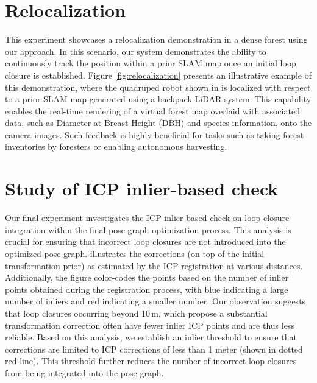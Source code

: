 \section{Relocalization} 
\label{sec:exp_relocalization}
This experiment showcases a relocalization demonstration in a dense forest using our approach. In this scenario, our system demonstrates the ability to continuously track the position within a prior SLAM map once an initial loop closure is established.
Figure \ref{fig:relocalization} presents an illustrative example of this demonstration, where the quadruped robot shown in  is localized with respect to a prior SLAM map generated using a backpack LiDAR system. This capability enables the real-time rendering of a virtual forest map overlaid with associated data, such as Diameter at Breast Height (DBH) and species information, onto the camera images. Such feedback is highly beneficial for tasks such as taking forest inventories by foresters or enabling autonomous harvesting.



\section{Study of ICP inlier-based check}
\label{sec:exp_icp_ablation}

Our final experiment investigates the ICP inlier-based check on loop closure integration within the final pose graph optimization process. This analysis is crucial for ensuring that incorrect loop closures are not introduced into the optimized pose graph.
 illustrates the corrections (on top of the initial transformation prior) as estimated by the ICP registration at various distances. Additionally, the figure color-codes the points based on the number of inlier points obtained during the registration process, with blue indicating a large number of inliers and red indicating a smaller number.
Our observation suggests that loop closures occurring beyond 10\,m, which propose a substantial transformation correction often have fewer inlier ICP points and are thus less reliable.
Based on this analysis, we establish an inlier threshold to ensure that corrections are limited to ICP corrections of less than 1 meter (shown in dotted red line). This threshold further reduces the number of incorrect loop closures from being integrated into the pose graph.

